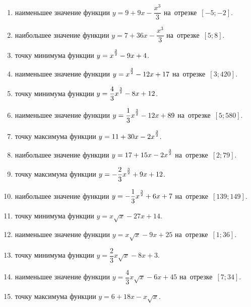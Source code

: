 \documentclass[a4paper,10pt]{article}
\begin{document}
\begin{enumerate}
\item {} наименьшее значение функции $y=9 +9x-\dfrac{x^3}{3}$ на~отрезке~$\left[-5;-2\right]$.

\item {} наибольшее значение функции $y=7 +36x-\dfrac{x^3}{3}$ на~отрезке~$\left[5;8\right]$.

\item {} точку минимума функции $y=x\strut^{\frac{3}{2}} -9x+4$.

\item {} наименьшее значение функции $y=x\strut^{\frac{3}{2}} -12x+17$ на~отрезке~$\left[3;420\right]$.

\item {} точку минимума функции $y=\dfrac{4}{3}x\strut^{\frac{3}{2}} -8x+12$.

\item {} наименьшее значение функции $y=\dfrac{1}{3}x\strut^{\frac{3}{2}} -12x+89$ на~отрезке~$\left[5;580\right]$.

\item {} точку максимума функции $y=11+30x-2x\strut^{\frac{3}{2}}$.

\item {} наибольшее значение функции $y=17+15x-2x\strut^{\frac{3}{2}}$ на~отрезке~$\left[2;79\right]$.

\item {} точку максимума функции $y=-\dfrac{2}{3}x\strut^{\frac{3}{2}} +9x+12$.

\item {} наибольшее значение функции $y=-\dfrac{1}{3}x\strut^{\frac{3}{2}} +6x+7$ на~отрезке~$\left[139;149\right]$.

\item {} точку минимума функции $y=x\sqrt{x} -27x+14$.

\item {} наименьшее значение функции $y=x\sqrt{x} -9x+25$ на~отрезке~$\left[1;36\right]$.

\item {} точку минимума функции $y=\dfrac{2}{3}x\sqrt{x} -8x+3$.

\item {} наименьшее значение функции $y=\dfrac{4}{3}x\sqrt{x} -6x+45$ на~отрезке~$\left[7;34\right]$.

\item {} точку максимума функции $y=6+18x -x\sqrt{x}$.


\end{enumerate}
\end{document}
